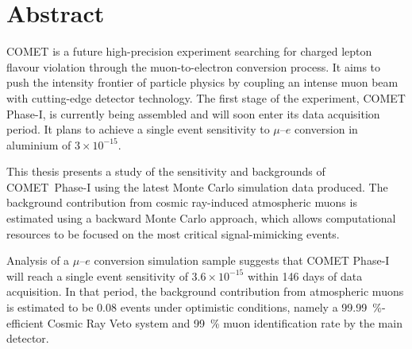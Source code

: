 \chapter*{Abstract}


COMET is a future high-precision experiment searching for charged lepton flavour
violation through the muon-to-electron conversion process. It aims to push the
intensity frontier of particle physics by coupling an intense muon beam with
cutting-edge detector technology. The first stage of the experiment, COMET
Phase\nobreakdash-I, is currently being assembled and will soon enter its data acquisition
period. It plans to achieve a single event sensitivity to $\mu$--$e$ conversion
in aluminium of $3 \times 10^{-15}$.

This thesis presents a study of the sensitivity and backgrounds of \mbox{COMET
Phase\nobreakdash-I} using the latest Monte Carlo simulation data produced. The background
contribution from cosmic ray-induced atmospheric muons is estimated using a
backward Monte Carlo approach, which allows computational resources to be
focused on the most critical signal-mimicking events.

Analysis of a $\mu$--$e$ conversion simulation sample suggests that COMET
Phase\nobreakdash-I will reach a single event sensitivity of $3.6 \times 10^{-15}$ within 146
days of data acquisition. In that period, the background contribution from
atmospheric muons is estimated to be 0.08 events under optimistic conditions,
namely a \SI{99.99}{\percent}-efficient Cosmic Ray Veto system and
\SI{99}{\percent} muon identification rate by the main detector.